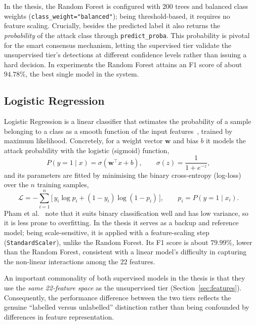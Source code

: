 In the thesis, the Random Forest is configured with $200$ trees and
balanced class weights (\texttt{class\_weight="balanced"}); being
threshold-based, it requires no feature scaling. Crucially, besides the
predicted label it also returns the \emph{probability} of the attack class
through \texttt{predict\_proba}. This probability is pivotal for the smart
consensus mechanism, letting the supervised tier validate the unsupervised
tier's detections at different confidence levels rather than issuing a hard
decision. In experiments the Random Forest attains an F1 score of about
$94.78\%$, the best single model in the system.

\subsection{Logistic Regression}

Logistic Regression is a linear classifier that estimates the probability
of a sample belonging to a class as a smooth function of the input
features~\cite{pham2016}, trained by maximum likelihood. Concretely, for a
weight vector $\mathbf{w}$ and bias $b$ it models the attack probability with
the logistic (sigmoid) function,
\begin{equation}
  P(y=1 \mid x) = \sigma(\mathbf{w}^{\top}x + b),
  \qquad
  \sigma(z) = \frac{1}{1 + e^{-z}},
  \label{eq:sigmoid}
\end{equation}
and its parameters are fitted by minimising the binary cross-entropy
(log-loss) over the $n$ training samples,
\begin{equation}
  \mathcal{L} = -\sum_{i=1}^{n}
  \Big[\, y_i \log p_i + (1-y_i)\log(1-p_i) \,\Big],
  \qquad p_i = P(y=1 \mid x_i).
  \label{eq:logloss}
\end{equation}
Pham et al.~\cite{pham2016} note that it suits binary classification well and
has low variance, so it is less prone to overfitting. In the thesis it serves
as a backup and reference model; being scale-sensitive, it is applied with
a feature-scaling step (\texttt{StandardScaler}), unlike the Random Forest.
Its F1 score is about $79.99\%$, lower than the Random Forest, consistent
with a linear model's difficulty in capturing the non-linear interactions
among the $22$ features.

An important commonality of both supervised models in the thesis is that
they use the \emph{same 22-feature space} as the unsupervised tier
(Section~\ref{sec:features}). Consequently, the performance difference
between the two tiers reflects the genuine ``labelled versus unlabelled''
distinction rather than being confounded by differences in feature
representation.

